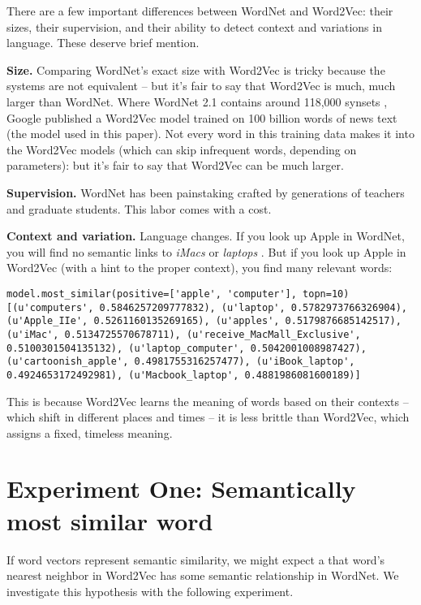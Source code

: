 \documentclass{article}
\begin{document}
There are a few important differences between WordNet and Word2Vec: their sizes, their supervision, and their ability to detect context and variations in language. These deserve brief mention.

\textbf{Size.} Comparing WordNet's exact size with Word2Vec is tricky because the systems are not equivalent -- but it's fair to say that Word2Vec is much, much larger than WordNet. Where WordNet 2.1 contains around 118,000 synsets \cite{wordnet}, Google published a Word2Vec model trained on 100 billion words \cite{Word2VecWebsite} of news text (the model used in this paper). Not every word in this training data makes it into the Word2Vec models (which can skip infrequent words, depending on parameters): but it's fair to say that Word2Vec can be much larger. 

\textbf{Supervision.} WordNet has been painstaking crafted by generations of teachers and graduate students. This labor comes with a cost.

\textbf{Context and variation.} Language changes. If you look up Apple in WordNet, you will find no semantic links to \textit{iMacs} or \textit{laptops} \cite{widdows}. But if you look up Apple in Word2Vec (with a hint to the proper context), you find many relevant words: 

\begin{lstlisting}
model.most_similar(positive=['apple', 'computer'], topn=10)
[(u'computers', 0.5846257209777832), (u'laptop', 0.5782973766326904), (u'Apple_IIe', 0.5261160135269165), (u'apples', 0.5179876685142517), (u'iMac', 0.5134725570678711), (u'receive_MacMall_Exclusive', 0.5100301504135132), (u'laptop_computer', 0.5042001008987427), (u'cartoonish_apple', 0.4981755316257477), (u'iBook_laptop', 0.4924653172492981), (u'Macbook_laptop', 0.4881986081600189)]
\end{lstlisting}

This is because Word2Vec learns the meaning of words based on their contexts -- which shift in different places and times -- it is less brittle than Word2Vec, which assigns a fixed, timeless meaning. 

\section{Experiment One: Semantically most similar word}
If word vectors represent semantic similarity, we might expect a that word's nearest neighbor in Word2Vec has some semantic relationship in WordNet. We investigate this hypothesis with the following experiment. 
\end{document}

